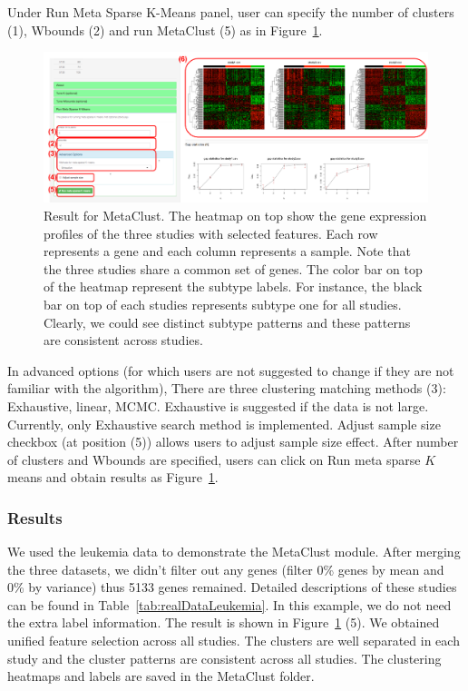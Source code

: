\begin{steps}
Under Run Meta Sparse K-Means panel,
user can specify the number of clusters {\color{red} (1)}, Wbounds {\color{red} (2)} and run MetaClust {\color{red} (5)} 
as in Figure~\ref{fig:mskmRes}.
\begin{figure}[H]
\begin{center}
\includegraphics[scale=0.5]{./figure/metaClust/mskmRes.pdf}
\caption{Result for MetaClust.
The heatmap on top show the gene expression profiles of the three studies with selected features.
Each row represents a gene and each column represents a sample.
Note that the three studies share a common set of genes.
The color bar on top of the heatmap represent the subtype labels.
For instance, the black bar on top of each studies represents subtype one for all studies.
Clearly, we could see distinct subtype patterns and these patterns are consistent across studies.
}
\label{fig:mskmRes}
\end{center}
\end{figure}
In advanced options (for which users are not suggested to change if they are not familiar with the algorithm), 
There are three clustering matching methods {\color{red} (3)}: Exhaustive, linear, MCMC.
Exhaustive is suggested if the data is not large.
Currently, only Exhaustive search method is implemented.
Adjust sample size checkbox (at position {\color{red} (5)}) allows users to adjust sample size effect.
After number of clusters and Wbounds are specified,
users can click on Run meta sparse $K$ means and obtain results as Figure~\ref{fig:mskmRes}.
\end{steps}


\subsubsection{Results}

We used the leukemia data to demonstrate the MetaClust module.
After merging the three datasets, we didn't filter out any genes (filter 0\% genes by mean and 0\% by variance) thus 5133 genes remained.
Detailed descriptions of these studies can be found in Table~\ref{tab:realDataLeukemia}. 
In this example, we do not need the extra label information.
The result is shown in Figure~\ref{fig:mskmRes} {\color{red} (5)}.
We obtained unified feature selection across all studies.
The clusters are well separated in each study and the cluster patterns are consistent across all studies.
The clustering heatmaps and labels are saved in the MetaClust folder.










